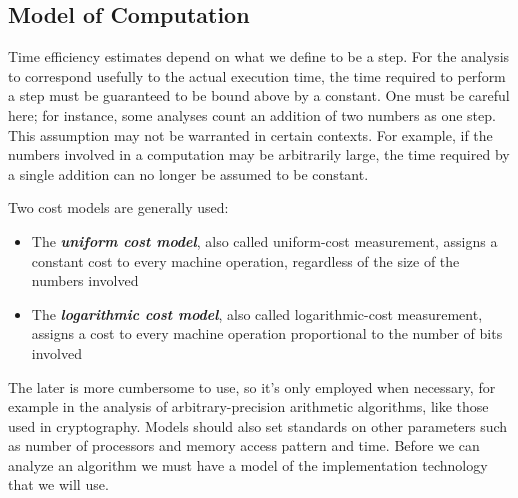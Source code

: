 \documentclass[12pt,a4paper]{book}
\begin{document}
\subsection{Model of Computation}
Time efficiency estimates depend on what we define to be a step. For the analysis to correspond usefully to the actual execution time, the time required to perform a step must be guaranteed to be bound above by a constant. One must be careful here; for instance, some analyses count an addition of two numbers as one step. This assumption may not be warranted in certain contexts. For example, if the numbers involved in a computation may be arbitrarily large, the time required by a single addition can no longer be assumed to be constant.
\par
Two cost models are generally used:
\begin{itemize}
\item The \textbf{\textit{uniform cost model}}, also called uniform-cost measurement, assigns a constant cost to every machine operation, regardless of the size of the numbers involved
\item The \textbf{\textit{logarithmic cost model}}, also called logarithmic-cost measurement, assigns a cost to every machine operation proportional to the number of bits involved
\end{itemize}
The later is more cumbersome to use, so it's only employed when necessary, for example in the analysis of arbitrary-precision arithmetic algorithms, like those used in cryptography. Models should also set standards on other parameters such as number of processors and memory access pattern and time. Before we can analyze an algorithm we must have a model of the implementation technology that we will use. 
\end{document}
